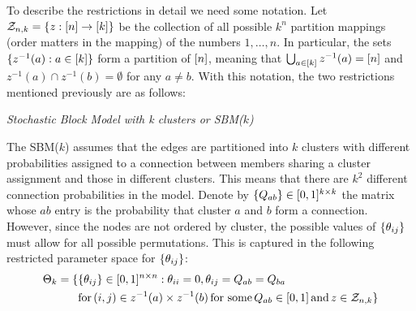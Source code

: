 \documentclass[11pt]{article}
\begin{document}
To describe the restrictions in detail we need some notation. Let $\mathcal{Z}_{n,k} = \{z : \lbrack n\rbrack \rightarrow \lbrack k\rbrack\}$ be the collection of all possible $k^n$ partition mappings (order matters in the mapping) of the numbers $1, \dots, n$. In particular, the sets $\{z^{-1}(a) : a \in \lbrack k\rbrack\}$ form a partition of $\lbrack n\rbrack$, meaning that $\bigcup_{a \in \lbrack k\rbrack} z^{-1}(a) = \lbrack n\rbrack$ and $z^{-1}(a) \cap z^{-1}(b) = \emptyset$ for any $a \neq b$. With this notation, the two restrictions mentioned previously are as follows:

\begin{assump}\label{assump:sbm}
\textit{Stochastic Block Model with k clusters or SBM($k$)}

\noindent
The SBM($k$) assumes that the edges are partitioned into $k$ clusters with different probabilities assigned to a connection between members sharing a cluster assignment and those in different clusters. This means that there are $k^2$ different connection probabilities in the model. Denote by $\{Q_{ab}\} \in [0, 1]^{k \times k}$ the matrix whose $ab$ entry is the probability that cluster $a$ and $b$ form a connection. However, since the nodes are not ordered by cluster, the possible values of $\{\theta_{ij}\}$ must allow for all possible permutations. This is captured in the following restricted parameter space for $\{\theta_{ij}\}$:
\begin{equation}
\begin{aligned}
\Theta_k = \{&\{\theta_{ij}\} \in [0, 1]^{n \times n} : \theta_{ii} = 0, \theta_{ij} = Q_{ab} = Q_{ba}\\
    & \text{for} \, (i, j) \in z^{-1}(a) \times z^{-1}(b) \, \text{for some} \, Q_{ab} \in [0, 1] \, \text{and} \, z \in \mathcal{Z}_{n,k}\}
\end{aligned}
\end{equation}
\end{assump}
\end{document}

